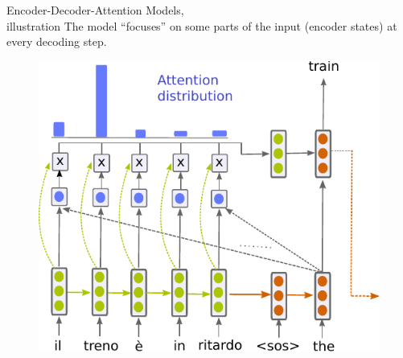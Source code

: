 \begin{frame}{Encoder-Decoder-Attention Models,\\illustration}
The model ``focuses'' on some parts of the input (encoder states) at every decoding step.
\begin{figure}
  \begin{center}
    \includegraphics[height=0.9\textheight]{figures/enc-dec-att.pdf}
  \end{center}
\vspace{-3mm}
\end{figure}
\end{frame}

